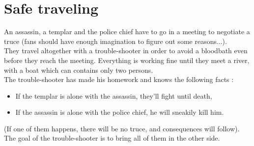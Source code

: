 \documentclass[11pt,a4paper,BCOR12mm, headexclude, footexclude, twoside, openright]{scrartcl}
\numberwithin{equation}{section} %
\numberwithin{figure}{section} %
\numberwithin{table}{section} %
\begin{document}
\begin{center}
\end{center}

\section{Safe traveling}

An assassin, a templar and the police chief have to go in a meeting to negotiate a truce (fans should have enough imagination to figure out some reasons...).\\

They travel altogether with a trouble-shooter in order to avoid a bloodbath even before they reach the meeting. Everything is working fine until they meet a river, with a boat which can contains only two persons.\\

The trouble-shooter has made his homework and knows the following facts : 

\begin{itemize}
	\item If the templar is alone with the assassin, they'll fight until death,
    \item If the assassin is alone with the police chief, he will sneakily kill him. 
\end{itemize}

(If one of them happens, there will be no truce, and consequences will follow).\\

The goal of the trouble-shooter is to bring all of them in the other side.\\
\end{document}
